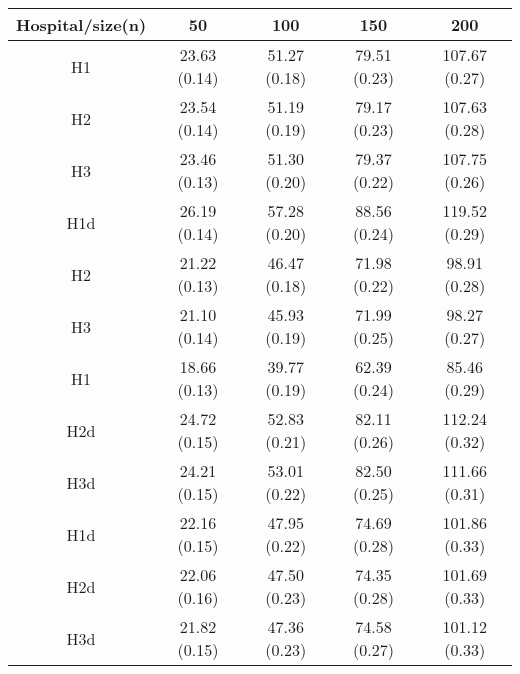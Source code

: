 \begin{center}
\begin{tabular}{c | c | c | c | c}
Hospital/size(n) & 50 & 100 & 150 & 200\\ \hline
H1 & 23.63 (0.14) & 51.27 (0.18) & 79.51 (0.23) & 107.67 (0.27) \\
H2 & 23.54 (0.14) & 51.19 (0.19) & 79.17 (0.23) & 107.63 (0.28) \\
H3 & 23.46 (0.13) & 51.30 (0.20) & 79.37 (0.22) & 107.75 (0.26) \\
H1d & 26.19 (0.14) & 57.28 (0.20) & 88.56 (0.24) & 119.52 (0.29) \\
H2 & 21.22 (0.13) & 46.47 (0.18) & 71.98 (0.22) & 98.91 (0.28) \\
H3 & 21.10 (0.14) & 45.93 (0.19) & 71.99 (0.25) & 98.27 (0.27) \\
H1 & 18.66 (0.13) & 39.77 (0.19) & 62.39 (0.24) & 85.46 (0.29) \\
H2d & 24.72 (0.15) & 52.83 (0.21) & 82.11 (0.26) & 112.24 (0.32) \\
H3d & 24.21 (0.15) & 53.01 (0.22) & 82.50 (0.25) & 111.66 (0.31) \\
H1d & 22.16 (0.15) & 47.95 (0.22) & 74.69 (0.28) & 101.86 (0.33) \\
H2d & 22.06 (0.16) & 47.50 (0.23) & 74.35 (0.28) & 101.69 (0.33) \\
H3d & 21.82 (0.15) & 47.36 (0.23) & 74.58 (0.27) & 101.12 (0.33) \\
\end{tabular}
\end{center}
